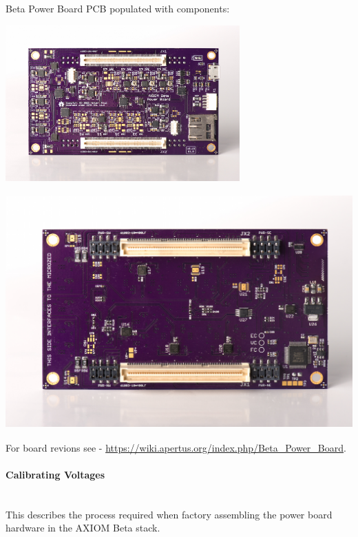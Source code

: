 Beta Power Board PCB populated with components:\\

\begin{center}
\includegraphics[height=6cm]{images/BetaPowerBoard_0.18_TOP}
\end{center}

\begin{center}
\includegraphics[height=9cm]{images/BetaPowerBoard_0.18_BOTTOM}
\end{center}

For board revions see - \href{https://wiki.apertus.org/index.php/Beta_Power_Board}{https://wiki.apertus.org/index.php/Beta_Power_Board}.\\


\paragraph{Calibrating Voltages}\\

This describes the process required when factory assembling the power board hardware in the AXIOM Beta stack.\\

